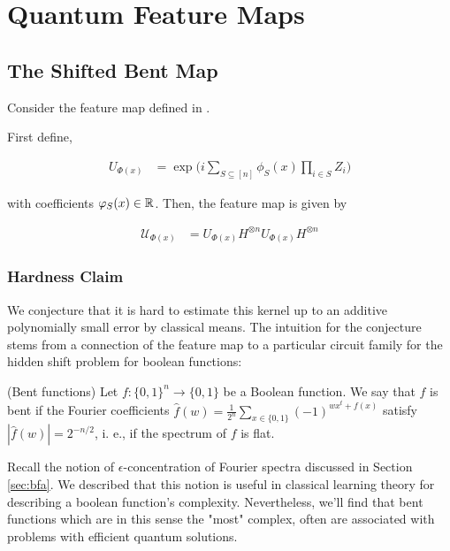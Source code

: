 \documentclass[main.tex]{subfiles}
\begin{document}
\section{Quantum Feature Maps}

\subsection{The Shifted Bent Map}

Consider the feature map defined in \cite{havlicek2018supervised}.

First define,

\begin{align*}
U_{\Phi(x)} &= \exp\Big(i \sum_{S \subseteq [n]} \phi_S(x) \prod_{i \in S} Z_i \Big)	
\end{align*}

with coefficients $\varphi_S(x) \in \mathbb{R}$. Then, the feature map is given by 


\begin{align}
\label{feat-map:hav}
\mathcal{U}_{\Phi(x)} &= U_{\Phi(x)} H^{\otimes n} U_{\Phi(x)} H^{\otimes n}
\end{align}


\subsubsection{Hardness Claim}

We conjecture that it is hard to estimate this kernel up to an additive polynomially small error by classical means. The intuition for the conjecture stems from a connection of the feature map to a particular circuit family for the hidden shift problem for boolean functions:

\begin{definition}(Bent functions) Let $f : \{0,1\}^n \rightarrow \{0, 1\}$ be a Boolean function. We say that $f$ is bent if the Fourier coefficients $\hat{f}(w) = \frac{1}{2^n}\sum_{x \in \{0, 1\}} (-1)^{wx^t + f(x)}$ satisfy $|\hat{f}(w)| = 2^{-n /2}$, i. e., if the spectrum of $f$ is flat.
\end{definition}

Recall the notion of $\epsilon$-concentration of Fourier spectra discussed in Section \ref{sec:bfa}. We described that this notion is useful in classical learning theory for describing a boolean function's complexity. Nevertheless, we'll find that bent functions which are in this sense the "most" complex, often are associated with problems with efficient quantum solutions.
\end{document}
